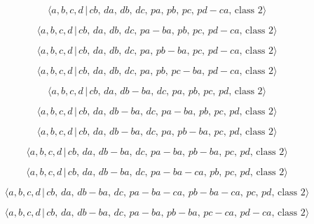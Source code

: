 \documentclass[10pt]{article}
\begin{document}
\begin{equation}
\langle a,b,c,d\,|\,cb,\,da,\,db,\,dc,\,pa,\,pb,\,pc,\,pd-ca,\,\text{class }%
2\rangle  \tag{6.29}
\end{equation}

\begin{equation}
\langle a,b,c,d\,|\,cb,\,da,\,db,\,dc,\,pa-ba,\,pb,\,pc,\,pd-ca,\,\text{
class }2\rangle  \tag{6.30}
\end{equation}

\begin{equation}
\langle a,b,c,d\,|\,cb,\,da,\,db,\,dc,\,pa,\,pb-ba,\,pc,\,pd-ca,\,\text{
class }2\rangle  \tag{6.31}
\end{equation}

\begin{equation}
\langle a,b,c,d\,|\,cb,\,da,\,db,\,dc,\,pa,\,pb,\,pc-ba,\,pd-ca,\,\text{
class }2\rangle  \tag{6.32}
\end{equation}

\begin{equation}
\langle a,b,c,d\,|\,cb,\,da,\,db-ba,\,dc,\,pa,\,pb,\,pc,\,pd,\,\text{class }%
2\rangle  \tag{6.33}
\end{equation}

\begin{equation}
\langle a,b,c,d\,|\,cb,\,da,\,db-ba,\,dc,\,pa-ba,\,pb,\,pc,\,pd,\,\text{
class }2\rangle  \tag{6.34}
\end{equation}

\begin{equation}
\langle a,b,c,d\,|\,cb,\,da,\,db-ba,\,dc,\,pa,\,pb-ba,\,pc,\,pd,\,\text{
class }2\rangle  \tag{6.35}
\end{equation}

\begin{equation}
\langle a,b,c,d\,|\,cb,\,da,\,db-ba,\,dc,\,pa-ba,\,pb-ba,\,pc,\,pd,\,\text{
class }2\rangle  \tag{6.36}
\end{equation}

\begin{equation}
\langle a,b,c,d\,|\,cb,\,da,\,db-ba,\,dc,\,pa-ba-ca,\,pb,\,pc,\,pd,\,\text{
class }2\rangle  \tag{6.37}
\end{equation}

\begin{equation}
\langle a,b,c,d\,|\,cb,\,da,\,db-ba,\,dc,\,pa-ba-ca,\,pb-ba-ca,\,pc,\,pd,\,%
\text{class }2\rangle  \tag{6.38}
\end{equation}

\begin{equation}
\langle a,b,c,d\,|\,cb,\,da,\,db-ba,\,dc,\,pa-ba,\,pb-ba,\,pc-ca,\,pd-ca,\,%
\text{class }2\rangle  \tag{6.39}
\end{equation}
\end{document}
